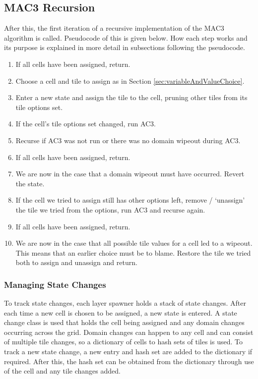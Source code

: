 \subsection{MAC3 Recursion}
After this, the first iteration of a recursive implementation of the MAC3 algorithm is called. Pseudocode of this is given below. How each step works and its purpose is explained in more detail in subsections following the pseudocode.

\begin{enumerate}
    \item If all cells have been assigned, return.
    \item Choose a cell and tile to assign as in Section \ref{sec:variableAndValueChoice}.
    \item Enter a new state and assign the tile to the cell, pruning other tiles from its tile options set.
    \item If the cell's tile options set changed, run AC3.
    \item Recurse if AC3 was not run or there was no domain wipeout during AC3.
    \item If all cells have been assigned, return.
    \item We are now in the case that a domain wipeout must have occurred. Revert the state.
    \item If the cell we tried to assign still has other options left, remove / `unassign' the tile we tried from the options, run AC3 and recurse again.
    \item If all cells have been assigned, return.
    \item We are now in the case that all possible tile values for a cell led to a wipeout. This means that an earlier choice must be to blame. Restore the tile we tried both to assign and unassign and return.
\end{enumerate}

\subsubsection{Managing State Changes}
To track state changes, each layer spawner holds a stack of state changes. After each time a new cell is chosen to be assigned, a new state is entered. A state change class is used that holds the cell being assigned and any domain changes occurring across the grid. Domain changes can happen to any cell and can consist of multiple tile changes, so a dictionary of cells to hash sets of tiles is used. To track a new state change, a new entry and hash set are added to the dictionary if required. After this, the hash set can be obtained from the dictionary through use of the cell and any tile changes added.

